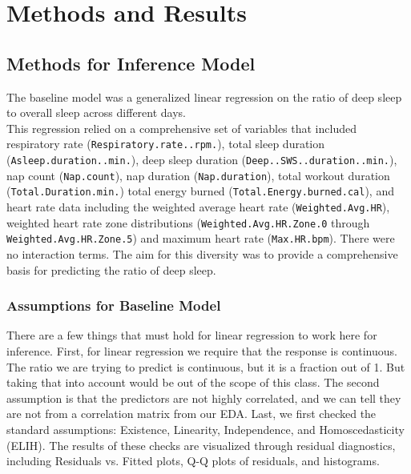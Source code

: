 \documentclass{article}
\begin{document}
\section{\hspace{0.5em} Methods and Results}

\subsection{\hspace{0.5em} Methods for Inference Model}

The baseline model was a generalized linear regression on the ratio of deep sleep to overall sleep across different days. \\

This regression relied on a comprehensive set of variables that included respiratory rate (\verb|Respiratory.rate..rpm.|), total sleep duration (\verb|Asleep.duration..min.|), deep sleep duration (\verb|Deep..SWS..duration..min.|), nap count (\verb|Nap.count|),  nap duration (\verb|Nap.duration|), total workout duration (\verb|Total.Duration.min.|)  total energy burned (\verb|Total.Energy.burned.cal|),  and heart rate data including the weighted average heart rate (\verb|Weighted.Avg.HR|), weighted heart rate zone distributions (\verb|Weighted.Avg.HR.Zone.0| through \verb|Weighted.Avg.HR.Zone.5|) and maximum heart rate (\verb|Max.HR.bpm|). There were no interaction terms. The aim for this diversity was to provide a comprehensive basis for predicting the ratio of deep sleep.
 
\subsubsection{\hspace{0.5em} Assumptions for Baseline Model}

There are a few things that must hold for linear regression to work here for inference. First, for linear regression we require that the response is continuous. The ratio we are trying to predict is continuous, but it is a fraction out of 1. But taking that into account would be out of the scope of this class. The second assumption is that the predictors are not highly correlated, and we can tell they are not from a correlation matrix from our EDA. Last, we first checked the standard assumptions: Existence, Linearity, Independence, and Homoscedasticity (ELIH). The results of these checks are visualized through residual diagnostics, including Residuals vs. Fitted plots, Q-Q plots of residuals, and histograms.
\end{document}

